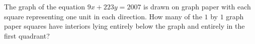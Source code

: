 The graph of the equation $9x+223y=2007$ is drawn on graph paper with each square representing one unit in each direction. How many of the $1$ by $1$ graph paper squares have interiors lying entirely below the graph and entirely in the first quadrant?